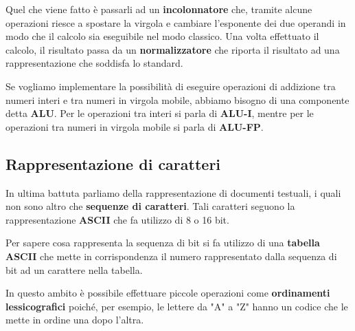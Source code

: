 Quel che viene fatto è passarli ad un \textbf{incolonnatore} che, tramite alcune operazioni riesce
a spostare la virgola e cambiare l'esponente dei due operandi in modo che il calcolo sia eseguibile
nel modo classico. Una volta effettuato il calcolo, il risultato passa da un \textbf{normalizzatore}
che riporta il risultato ad una rappresentazione che soddisfa lo standard.

Se vogliamo implementare la possibilità di eseguire operazioni di addizione tra numeri interi e tra
numeri in virgola mobile, abbiamo bisogno di una componente detta \textbf{ALU}. Per le operazioni
tra interi si parla di \textbf{ALU-I}, mentre per le operazioni tra numeri in virgola mobile si
parla di \textbf{ALU-FP}.

\subsection{Rappresentazione di caratteri}
In ultima battuta parliamo della rappresentazione di documenti testuali, i quali non sono altro
che \textbf{sequenze di caratteri}. Tali caratteri seguono la rappresentazione \textbf{ASCII} che
fa utilizzo di 8 o 16 bit.

Per sapere cosa rappresenta la sequenza di bit si fa utilizzo di una \textbf{tabella ASCII} che
mette in corrispondenza il numero rappresentato dalla sequenza di bit ad un carattere nella tabella.

In questo ambito è possibile effettuare piccole operazioni come \textbf{ordinamenti lessicografici}
poiché, per esempio, le lettere da "A" a "Z" hanno un codice che le mette in ordine una dopo
l'altra.